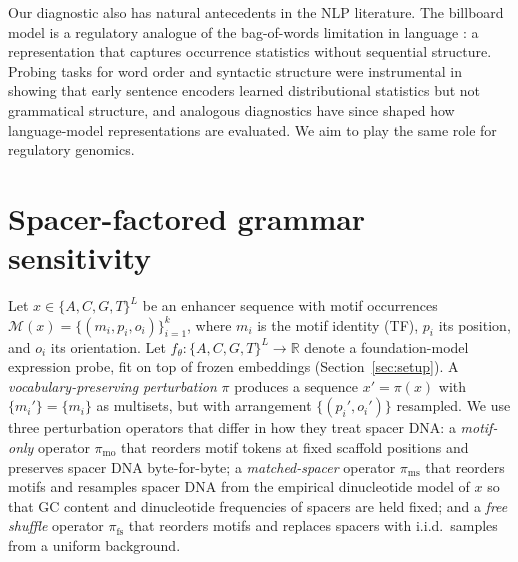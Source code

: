 \documentclass{article}
\begin{document}
Our diagnostic also has natural antecedents in the NLP literature. The billboard model is a regulatory analogue of the bag-of-words limitation in language \citep{harris1954distributional}: a representation that captures occurrence statistics without sequential structure. Probing tasks for word order and syntactic structure \citep{conneau2018senteval} were instrumental in showing that early sentence encoders learned distributional statistics but not grammatical structure, and analogous diagnostics have since shaped how language-model representations are evaluated. We aim to play the same role for regulatory genomics.

\section{Spacer-factored grammar sensitivity}
\label{sec:method}

Let $x \in \{A,C,G,T\}^L$ be an enhancer sequence with motif occurrences $\mathcal{M}(x) = \{(m_i, p_i, o_i)\}_{i=1}^{k}$, where $m_i$ is the motif identity (TF), $p_i$ its position, and $o_i$ its orientation. Let $f_\theta : \{A,C,G,T\}^L \to \mathbb{R}$ denote a foundation-model expression probe, fit on top of frozen embeddings (Section~\ref{sec:setup}). A \emph{vocabulary-preserving perturbation} $\pi$ produces a sequence $x' = \pi(x)$ with $\{m_i'\} = \{m_i\}$ as multisets, but with arrangement $\{(p_i', o_i')\}$ resampled. We use three perturbation operators that differ in how they treat spacer DNA: a \emph{motif-only} operator $\pi_{\mathrm{mo}}$ that reorders motif tokens at fixed scaffold positions and preserves spacer DNA byte-for-byte; a \emph{matched-spacer} operator $\pi_{\mathrm{ms}}$ that reorders motifs and resamples spacer DNA from the empirical dinucleotide model of $x$ so that GC content and dinucleotide frequencies of spacers are held fixed; and a \emph{free shuffle} operator $\pi_{\mathrm{fs}}$ that reorders motifs and replaces spacers with i.i.d.\ samples from a uniform background.
\end{document}
